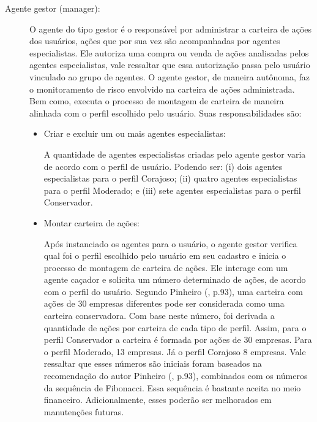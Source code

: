 \begin{description}
\item[Agente gestor (manager):]
O agente do tipo gestor é o responsável por administrar a carteira de ações dos usuários, ações que por sua vez são acompanhadas por agentes especialistas. Ele autoriza uma compra ou venda de ações analisadas pelos agentes especialistas, vale ressaltar que essa autorização passa pelo usuário vinculado ao grupo de agentes. O agente gestor, de maneira autônoma, faz o monitoramento de risco envolvido na carteira de ações administrada. Bem como, executa o processo de montagem de carteira de maneira alinhada com o perfil escolhido pelo usuário. Suas responsabilidades são:

\begin{itemize}
\item Criar e excluir um ou mais agentes especialistas:\newline

A quantidade de agentes especialistas criadas pelo agente gestor varia  de acordo com o perfil de usuário. Podendo ser: (i) dois agentes especialistas para o perfil Corajoso; (ii) quatro agentes especialistas para o perfil Moderado; e (iii) sete agentes especialistas para o perfil Conservador.

\item Montar carteira de ações:\newline

Após instanciado os agentes para o usuário, o agente gestor verifica qual foi o perfil escolhido pelo usuário em seu cadastro e inicia o processo de montagem de carteira de ações. Ele interage com um agente caçador e solicita um número determinado de ações, de acordo com o perfil do usuário. Segundo Pinheiro (\citeyear{pinheiro2008}, p.93), uma carteira com ações de 30 empresas diferentes pode ser considerada como uma carteira conservadora. Com base neste número, foi derivada a quantidade de ações por carteira de cada tipo de perfil. Assim, para o perfil Conservador a carteira é formada por ações de 30 empresas. Para o perfil Moderado, 13 empresas. Já o perfil Corajoso 8 empresas. Vale ressaltar que esses números são iniciais foram baseados na recomendação do autor Pinheiro (\citeyear{pinheiro2008}, p.93), combinados com os números da sequência de Fibonacci. Essa sequência é bastante aceita no meio financeiro. Adicionalmente, esses poderão ser melhorados em manutenções futuras.


\end{itemize}
\end{description}
